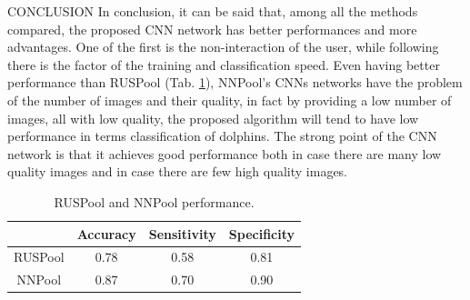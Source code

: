 \begin{frame}{CONCLUSION}
    In conclusion, it can be said that, among all the methods compared, the 
    proposed CNN network has better performances and more advantages. 
    One of the first is the non-interaction of the user, while following there is 
    the factor of the training and classification speed. Even having better 
    performance than RUSPool (Tab. \ref{RUSPoolPerf}), NNPool's CNNs networks have the 
    problem of the number of images and their quality, in fact by providing a 
    low number of images, all with low quality, the proposed algorithm will 
    tend to have low performance in terms classification of dolphins. The 
    strong point of the CNN network is that it achieves good performance 
    both in case there are many low quality images and in case there are few 
    high quality images.
    \begin{table}[htbp]
        \centering
        \begin{adjustbox}{width=0.6\textwidth}
        \begin{tabular}{|cccc|}
            \hline
            & Accuracy & Sensitivity & Specificity\\
            \hline
            RUSPool & 0.78 & 0.58 & 0.81\\
            NNPool & 0.87 & 0.70 & 0.90\\
            \hline
        \end{tabular}
        \end{adjustbox}
        \caption{RUSPool and NNPool performance.}
        \label{RUSPoolPerf}
    \end{table}
\end{frame}